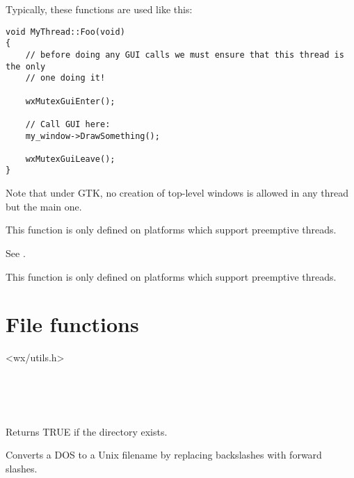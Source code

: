 Typically, these functions are used like this:

\begin{verbatim}
void MyThread::Foo(void)
{
    // before doing any GUI calls we must ensure that this thread is the only
    // one doing it!

    wxMutexGuiEnter();

    // Call GUI here:
    my_window->DrawSomething();

    wxMutexGuiLeave();
}
\end{verbatim}

Note that under GTK, no creation of top-level windows is allowed in any
thread but the main one.

This function is only defined on platforms which support preemptive
threads.

\label{wxmutexguileave}


See .

This function is only defined on platforms which support preemptive
threads.

\section{File functions}\label{filefunctions}


<wx/utils.h>


\\
\\
\\

\label{functionwxdirexists}


Returns TRUE if the directory exists.

\label{wxdos2unixfilename}


Converts a DOS to a Unix filename by replacing backslashes with forward
slashes.

\label{functionwxfileexists}

